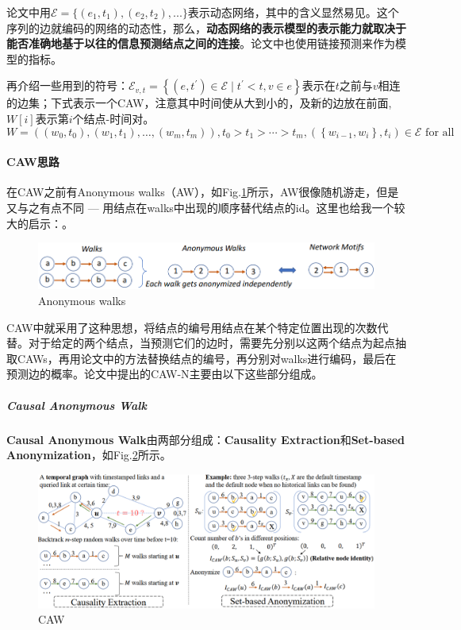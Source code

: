 论文中用$\mathcal{E}=\{(e_1, t_1), (e_2, t_2), ...\}$表示动态网络，其中的含义显然易见。这个序列的边就编码的网络的动态性，那么，\textbf{动态网络的表示模型的表示能力就取决于能否准确地基于以往的信息预测结点之间的连接}。论文中也使用链接预测来作为模型的指标。

再介绍一些用到的符号：$\mathcal{E}_{v, t}=\left\{\left(e, t^{\prime}\right) \in \mathcal{E} \mid t^{\prime}<t, v \in e\right\}$表示在$t$之前与$v$相连的边集；下式表示一个CAW，注意其中时间使从大到小的，及新的边放在前面,$W[i]$表示第$i$个结点-时间对。
$$
W=\left(\left(w_{0}, t_{0}\right),\left(w_{1}, t_{1}\right), \ldots,\left(w_{m}, t_{m}\right)\right), t_{0}>t_{1}>\cdots>t_{m},\left(\left\{w_{i-1}, w_{i}\right\}, t_{i}\right) \in \mathcal{E} \text { for all }
$$

\paragraph{CAW思路}
在CAW之前有Anonymous walks（AW）\cite{micali2016reconstructing}，如Fig.\ref{fig:aw}所示，AW很像随机游走，但是又与之有点不同 --- 用结点在walks中出现的顺序替代结点的id。这里也给我一个较大的启示：。
\begin{figure}[h]
	\centering
	\includegraphics[width=.8\textwidth]{pics/AW.png}
	\caption{Anonymous walks}
	\label{fig:aw}
\end{figure}

CAW中就采用了这种思想，将结点的编号用结点在某个特定位置出现的次数代替。对于给定的两个结点，当预测它们的边时，需要先分别以这两个结点为起点抽取CAWs，再用论文中的方法替换结点的编号，再分别对walks进行编码，最后在预测边的概率。论文中提出的CAW-N主要由以下这些部分组成。
\subparagraph{Causal Anonymous Walk}
\textbf{Causal Anonymous Walk}由两部分组成：\textbf{Causality Extraction}和\textbf{Set-based Anonymization}，如Fig.\ref{fig:caw}所示。

\begin{figure}[h]
	\centering
	\includegraphics[width=.8\textwidth]{pics/CAW.png}
	\caption{CAW}
	\label{fig:caw}
\end{figure}

